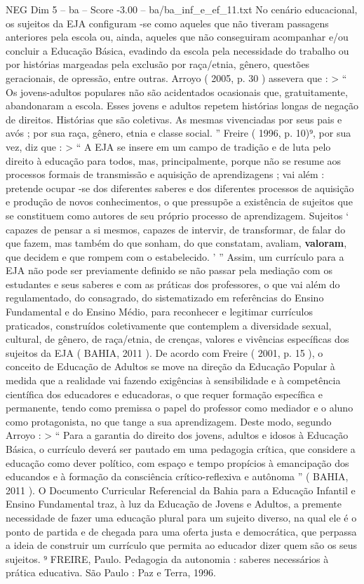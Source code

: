 \begin{textsample}{NEG Dim 5 – ba – Score -3.00 – ba/ba\_inf\_e\_ef\_11.txt}
No cenário educacional, os sujeitos da EJA configuram -se como aqueles que não tiveram passagens anteriores pela escola ou, ainda, aqueles que não conseguiram acompanhar e/ou concluir a Educação Básica, evadindo da escola pela necessidade do trabalho ou por histórias margeadas pela exclusão por raça/etnia, gênero, questões geracionais, de opressão, entre outras.
Arroyo ( 2005, p. 30 ) assevera que : > “ Os jovens-adultos populares não são acidentados ocasionais que, gratuitamente, abandonaram a escola.
Esses jovens e adultos repetem histórias longas de negação de direitos.
Histórias que são coletivas.
As mesmas vivenciadas por seus pais e avós ; por sua raça, gênero, etnia e classe social. ” Freire ( 1996, p. 10)⁹, por sua vez, diz que : > “ A EJA se insere em um campo de tradição e de luta pelo direito à educação para todos, mas, principalmente, porque não se resume aos processos formais de transmissão e aquisição de aprendizagens ; vai além : pretende ocupar -se dos diferentes saberes e dos diferentes processos de aquisição e produção de novos conhecimentos, o que pressupõe a existência de sujeitos que se constituem como autores de seu próprio processo de aprendizagem.
Sujeitos ‘ capazes de pensar a si mesmos, capazes de intervir, de transformar, de falar do que fazem, mas também do que sonham, do que constatam, avaliam, \textbf{valoram}, que decidem e que rompem com o estabelecido. ’ ” Assim, um currículo para a EJA não pode ser previamente definido se não passar pela mediação com os estudantes e seus saberes e com as práticas dos professores, o que vai além do regulamentado, do consagrado, do sistematizado em referências do Ensino Fundamental e do Ensino Médio, para reconhecer e legitimar currículos praticados, construídos coletivamente que contemplem a diversidade sexual, cultural, de gênero, de raça/etnia, de crenças, valores e vivências específicas dos sujeitos da EJA ( BAHIA, 2011 ).
De acordo com Freire ( 2001, p. 15 ), o conceito de Educação de Adultos se move na direção da Educação Popular à medida que a realidade vai fazendo exigências à sensibilidade e à competência científica dos educadores e educadoras, o que requer formação específica e permanente, tendo como premissa o papel do professor como mediador e o aluno como protagonista, no que tange a sua aprendizagem.
Deste modo, segundo Arroyo : > “ Para a garantia do direito dos jovens, adultos e idosos à Educação Básica, o currículo deverá ser pautado em uma pedagogia crítica, que considere a educação como dever político, com espaço e tempo propícios à emancipação dos educandos e à formação da consciência crítico-reflexiva e autônoma ” ( BAHIA, 2011 ).
O Documento Curricular Referencial da Bahia para a Educação Infantil e Ensino Fundamental traz, à luz da Educação de Jovens e Adultos, a premente necessidade de fazer uma educação plural para um sujeito diverso, na qual ele é o ponto de partida e de chegada para uma oferta justa e democrática, que perpassa a ideia de construir um currículo que permita ao educador dizer quem são os seus sujeitos. ⁹ FREIRE, Paulo.
Pedagogia da autonomia : saberes necessários à prática educativa.
São Paulo : Paz e Terra, 1996.

\end{textsample}

